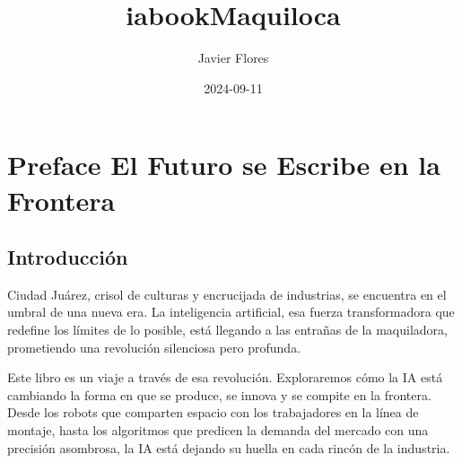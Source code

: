 \documentclass[
  10pt,
  letterpaper,
]{book}
\title{iabookMaquiloca}
\author{Javier Flores}
\date{2024-09-11}
\renewcommand*\contentsname{Table of contents}
\newcommand\contentsname{Table of contents}
\begin{document}
\frontmatter
\maketitle

\pretitle{\begin{center}\Huge\sffamily\bfseries}
\posttitle{\end{center}}
\preauthor{\begin{center}\large\sffamily}
\postauthor{\end{center}}
\predate{\begin{center}\large}
\postdate{\end{center}\vspace{2cm}}
\maketitle

\renewcommand*\contentsname{Table of contents}
{
\hypersetup{linkcolor=}
\setcounter{tocdepth}{1}
\tableofcontents
}

\mainmatter
{}

\chapter*{Preface El Futuro se Escribe en la
Frontera}\label{preface-el-futuro-se-escribe-en-la-frontera}


\section*{Introducción}\label{introducciuxf3n}


Ciudad Juárez, crisol de culturas y encrucijada de industrias, se
encuentra en el umbral de una nueva era. La inteligencia artificial, esa
fuerza transformadora que redefine los límites de lo posible, está
llegando a las entrañas de la maquiladora, prometiendo una revolución
silenciosa pero profunda.

Este libro es un viaje a través de esa revolución. Exploraremos cómo la
IA está cambiando la forma en que se produce, se innova y se compite en
la frontera. Desde los robots que comparten espacio con los trabajadores
en la línea de montaje, hasta los algoritmos que predicen la demanda del
mercado con una precisión asombrosa, la IA está dejando su huella en
cada rincón de la industria.
\end{document}
